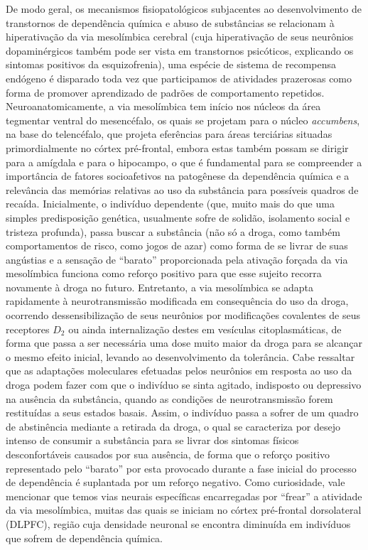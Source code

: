 \documentclass[
]{book}
\begin{document}
De modo geral, os mecanismos fisiopatológicos subjacentes ao desenvolvimento de transtornos de dependência química e abuso de substâncias se relacionam à hiperativação da via mesolímbica cerebral (cuja hiperativação de seus neurônios dopaminérgicos também pode ser vista em transtornos psicóticos, explicando os sintomas positivos da esquizofrenia), uma espécie de sistema de recompensa endógeno é disparado toda vez que participamos de atividades prazerosas como forma de promover aprendizado de padrões de comportamento repetidos. Neuroanatomicamente, a via mesolímbica tem início nos núcleos da área tegmentar ventral do mesencéfalo, os quais se projetam para o núcleo \emph{accumbens}, na base do telencéfalo, que projeta eferências para áreas terciárias situadas primordialmente no córtex pré-frontal, embora estas também possam se dirigir para a amígdala e para o hipocampo, o que é fundamental para se compreender a importância de fatores socioafetivos na patogênese da dependência química e a relevância das memórias relativas ao uso da substância para possíveis quadros de recaída. Inicialmente, o indivíduo dependente (que, muito mais do que uma simples predisposição genética, usualmente sofre de solidão, isolamento social e tristeza profunda), passa buscar a substância (não só a droga, como também comportamentos de risco, como jogos de azar) como forma de se livrar de suas angústias e a sensação de ``barato'' proporcionada pela ativação forçada da via mesolímbica funciona como reforço positivo para que esse sujeito recorra novamente à droga no futuro. Entretanto, a via mesolímbica se adapta rapidamente à neurotransmissão modificada em consequência do uso da droga, ocorrendo dessensibilização de seus neurônios por modificações covalentes de seus receptores \(D_2\) ou ainda internalização destes em vesículas citoplasmáticas, de forma que passa a ser necessária uma dose muito maior da droga para se alcançar o mesmo efeito inicial, levando ao desenvolvimento da tolerância. Cabe ressaltar que as adaptações moleculares efetuadas pelos neurônios em resposta ao uso da droga podem fazer com que o indivíduo se sinta agitado, indisposto ou depressivo na ausência da substância, quando as condições de neurotransmissão forem restituídas a seus estados basais. Assim, o indivíduo passa a sofrer de um quadro de abstinência mediante a retirada da droga, o qual se caracteriza por desejo intenso de consumir a substância para se livrar dos sintomas físicos desconfortáveis causados por sua ausência, de forma que o reforço positivo representado pelo ``barato'' por esta provocado durante a fase inicial do processo de dependência é suplantada por um reforço negativo. Como curiosidade, vale mencionar que temos vias neurais específicas encarregadas por ``frear'' a atividade da via mesolímbica, muitas das quais se iniciam no córtex pré-frontal dorsolateral (DLPFC), região cuja densidade neuronal se encontra diminuída em indivíduos que sofrem de dependência química.
\end{document}
